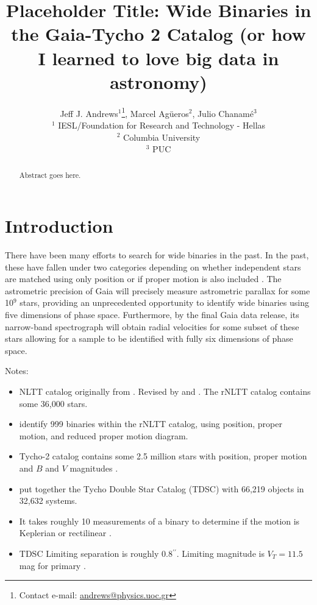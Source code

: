 \documentclass[usenatbib]{mnras}
\title[Gaia wide binaries]{Placeholder Title: Wide Binaries in the Gaia-Tycho 2 Catalog (or how I learned to love big data in astronomy)}
\author[J. J. Andrews et al.]{Jeff J. Andrews$^{1}$\thanks{Contact e-mail: \href{mailto:andrews@physics.uoc.gr}{andrews@physics.uoc.gr}}, Marcel Ag\"{u}eros$^2$, Julio Chanam\'{e}$^3$ \\
$^1$ IESL/Foundation for Research and Technology - Hellas \\
$^2$ Columbia University \\
$^3$ PUC}
\newcommand{\asec}{\ifmmode {^{\prime\prime}}\else$^{\prime\prime}$\fi}
\begin{document}
\label{firstpage}
\pagerange{\pageref{firstpage}--\pageref{lastpage}}
\maketitle



\begin{abstract}
Abstract goes here. 
\end{abstract}

\section{Introduction}

There have been many efforts to search for wide binaries in the past. In the past, these have fallen under two categories depending on whether independent stars are matched using only position \citep{bahcall81, gould95, dhital15} or if proper motion is also included \citep{luyten79, wasserman91, dhital10}. The astrometric precision of Gaia will precisely measure astrometric parallax for some 10$^9$ stars, providing an unprecedented opportunity to identify wide binaries using five dimensions of phase space. Furthermore, by the final Gaia data release, its narrow-band spectrograph will obtain radial velocities for some subset of these stars allowing for a sample to be identified with fully six dimensions of phase space.


Notes:
\begin{itemize}
\item NLTT catalog originally from \citet{luyten79}. Revised by \citet{gould03} and \citet{salim03}. The rNLTT catalog contains some 36,000 stars. 
\item \citet{chaname04} identify 999 binaries within the rNLTT catalog, using position, proper motion, and reduced proper motion diagram.
\item Tycho-2 catalog contains some 2.5 million stars with position, proper motion and $B$ and $V$ magnitudes \citep{hog00b}.
\item \citet{fabricius02} put together the Tycho Double Star Catalog (TDSC) with 66,219 objects in 32,632 systems.
\item It takes roughly 10 measurements of a binary to determine if the motion is Keplerian or rectilinear \citep{fabricius02}.\\
\item TDSC Limiting separation is roughly 0.8\asec. Limiting magnitude is $V_T=11.5$ mag for primary \citep{fabricius02}.
\end{itemize}
\end{document}
